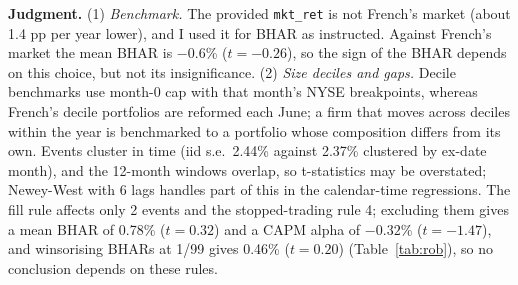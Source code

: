 \documentclass[10pt]{article}
\begin{document}
\medskip
\noindent\textbf{Judgment.} (1) \emph{Benchmark.} The provided \texttt{mkt\_ret} is not French's market (about 1.4 pp per year lower), and I used it for BHAR as instructed. Against French's market the mean BHAR is $-0.6$\% ($t=-0.26$), so the sign of the BHAR depends on this choice, but not its insignificance. (2) \emph{Size deciles and gaps.} Decile benchmarks use month-0 cap with that month's NYSE breakpoints, whereas French's decile portfolios are reformed each June; a firm that moves across deciles within the year is benchmarked to a portfolio whose composition differs from its own. Events cluster in time (iid s.e.\ 2.44\% against 2.37\% clustered by ex-date month), and the 12-month windows overlap, so t-statistics may be overstated; Newey-West with 6 lags handles part of this in the calendar-time regressions. The fill rule affects only 2 events and the stopped-trading rule 4; excluding them gives a mean BHAR of 0.78\% ($t=0.32$) and a CAPM alpha of $-0.32$\% ($t=-1.47$), and winsorising BHARs at 1/99 gives 0.46\% ($t=0.20$) (Table~\ref{tab:rob}), so no conclusion depends on these rules.



\end{document}
